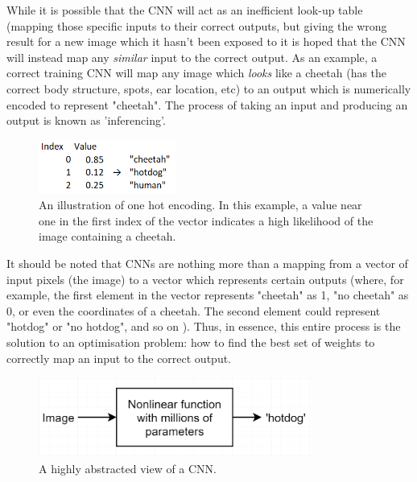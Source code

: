 While it is possible that the CNN will act as an inefficient look-up table (mapping those specific inputs to their correct outputs, but giving the wrong result for a new image which it hasn't been exposed to \cite{werbos1974beyond} it is hoped that the CNN will instead map any \emph{similar} input to the correct output. As an example, a correct training CNN will map any image which \emph{looks} like a cheetah (has the correct body structure, spots, ear location, etc) to an output which is numerically encoded to represent "cheetah". The process of taking an input and producing an output is known as 'inferencing'.

\begin{figure}[h!]
  \centering
  \includegraphics[width=0.4\textwidth]{literature_review/one_hot_encoding}
  \caption{\label{fig:one_hot_encoding}An illustration of one hot encoding. In this example, a value near one in the first index of the vector indicates a high likelihood of the image containing a cheetah.}
\end{figure}

It should be noted that CNNs are nothing more than a mapping from a vector of input pixels (the image) to a vector which represents certain outputs (where, for example, the first element in the vector represents "cheetah" as 1, "no cheetah" as 0, or even the coordinates of a cheetah. The second element could represent "hotdog" or "no hotdog", and so on \cite{website:one_hot_encoding}). Thus, in essence, this entire process is the solution to an optimisation problem: how to find the best set of weights to correctly map an input to the correct output.

\begin{figure}[h!]
  \centering
  \includegraphics[width=0.8\textwidth]{literature_review/img_to_result}
  \caption{\label{fig:img_to_result}A highly abstracted view of a CNN.}
\end{figure}

